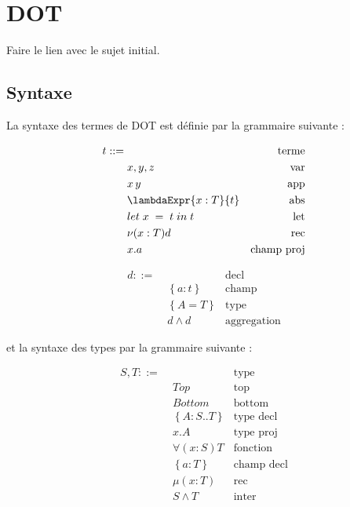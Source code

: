 \chapter{DOT}

Faire le lien avec le sujet initial.

\section{Syntaxe}

La syntaxe des termes de DOT est définie par la grammaire suivante :
\begin{minipage}{0.45\textwidth}
  \begin{align*}
    t ::= & \, & \text{terme} \\
          & \; x, y, z & \text{var} \\
          & \; x \, y & \text{app} \\
          & \; \lambdaExpr{x : T}{t} & \text{abs} \\
          & \; \localLetBinding{x}{t}{t} & \text{let} \\
          & \; \nu(x : T)d & \text{rec} \\
          & \; x.a & \text{champ proj} \\
\end{align*}
\end{minipage}
\begin{minipage}{0.45\textwidth}
  \begin{align*}
    d ::= & \, & \text{decl} \\
          & \; \left\{ a : t \right\} & \text{champ} \\
          & \; \left\{ A = T \right\} & \text{type} \\
          & \; d \wedge d & \text{aggregation}
\end{align*}
\end{minipage}

et la syntaxe des types par la grammaire suivante :

\begin{align*}
  S, T ::= & \, & \text{type} \\
           & \; Top & \text{top} \\
           & \; Bottom & \text{bottom} \\
           & \; \left\{ A : S .. T \right\} & \text{type decl} \\
           & \; x.A & \text{type proj} \\
           & \; \forall(x : S) T & \text{fonction} \\
           & \; \left\{ a : T \right\} & \text{champ decl} \\
           & \; \mu(x : T) & \text{rec} \\
           & \; S \wedge T & \text{inter}
\end{align*}

